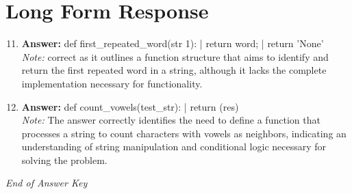 \documentclass[12pt]{article}
\begin{document}
\section*{Long Form Response}
\begin{enumerate}[label=\arabic*.]
\setcounter{enumi}{10}
\item \textbf{Answer:} def first\_repeated\_word(str 1): | return word; | return 'None'
\\ \textit{Note:} correct as it outlines a function structure that aims to identify and return the first repeated word in a string, although it lacks the complete implementation necessary for functionality.
\item \textbf{Answer:} def count\_vowels(test\_str): | return (res)
\\ \textit{Note:} The answer correctly identifies the need to define a function that processes a string to count characters with vowels as neighbors, indicating an understanding of string manipulation and conditional logic necessary for solving the problem.
\end{enumerate}

\vfill
\noindent\textit{End of Answer Key}
\end{document}
